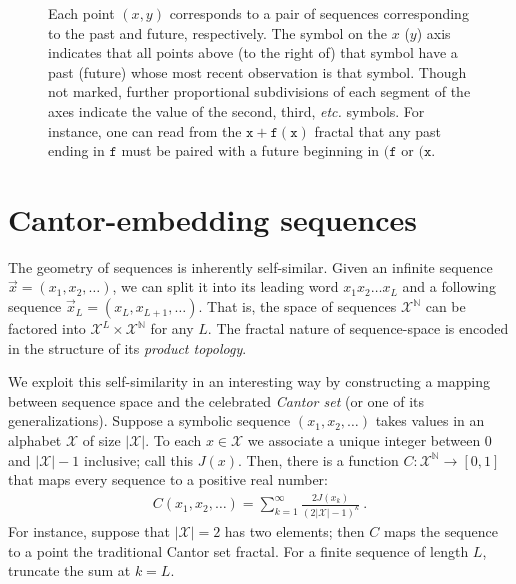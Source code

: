 \documentclass[sigconf, anonymous, review]{acmart}
\begin{document}
\begin{figure}[h]
{	Each point $(x,y)$ corresponds to a pair of sequences corresponding to the
	past and future, respectively. The symbol on the $x$ ($y$) axis indicates
	that all points above (to the right of) that symbol have a past (future)
	whose most recent observation is that symbol. Though not marked, further
	proportional subdivisions of each segment of the axes indicate the value of
	the second, third, \emph{etc.} symbols. For instance, one can read from the
	$\mathtt{x+f(x)}$ fractal that any past ending in $\mathtt{f}$ must be
	paired with a future beginning in $\mathtt{(f}$ or $\mathtt{(x}$.
	}
\label{fig:cantor}
\end{figure}

\section{Cantor-embedding sequences}

The geometry of sequences is inherently self-similar. Given an infinite sequence
$\overrightarrow{x} = (x_1,x_2,\dots)$, we can split it into its leading word
$x_1 x_2 \dots x_L$ and a following sequence $\overrightarrow{x}_L =
(x_L,x_{L+1},\dots)$. That is, the space of sequences $\mathcal{X}^\mathbb{N}$
can be factored into $\mathcal{X}^L\times \mathcal{X}^\mathbb{N}$ for any $L$.
The fractal nature of sequence-space is encoded in the structure of its
\emph{product topology}.

We exploit this self-similarity in an interesting way by constructing a mapping
between sequence space and the celebrated \emph{Cantor set} (or one of its
generalizations). Suppose a symbolic sequence $(x_1,x_2,\dots)$ takes values in
an alphabet $\mathcal{X}$ of size $|\mathcal{X}|$. To each $x\in\mathcal{X}$ we
associate a unique integer between $0$ and $|\mathcal{X}|-1$ inclusive; call
this $J(x)$. Then, there is a function $C:\mathcal{X}^\mathbb{N}\rightarrow
[0,1]$ that maps every sequence to a positive real number:
\begin{align*}
  C(x_1,x_2,\dots) = \sum_{k=1}^\infty \frac{2J(x_k)}{(2|\mathcal{X}|-1)^k}
  ~.
\end{align*}
For instance, suppose that $|\mathcal{X}|=2$ has two elements; then $C$ maps the
sequence to a point the traditional Cantor set fractal. For a finite sequence of
length $L$, truncate the sum at $k=L$.
\end{document}
